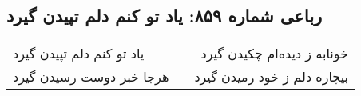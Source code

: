 \begin{center}
\section*{رباعی شماره ۸۵۹: یاد تو کنم دلم تپیدن گیرد}
\label{sec:0859}
\begin{longtable}{l p{0.5cm} r}
یاد تو کنم دلم تپیدن گیرد
&&
خونابه ز دیده‌ام چکیدن گیرد
\\
هرجا خبر دوست رسیدن گیرد
&&
بیچاره دلم ز خود رمیدن گیرد
\\
\end{longtable}
\end{center}
